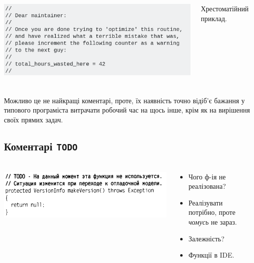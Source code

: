 \documentclass[12pt,pdf,utf8,ukrainian,aspectratio=169]{beamer}
\makeatletter
\newcommand*{\currentname}{\@currentlabelname}
\makeatother
\begin{document}
	\begin{frame}\frametitle{\currentname}
		\begin{columns}
			\begin{column}{10cm}
				\includegraphics[scale=0.65]{Comment_02.png}
			\end{column}
			\begin{column}{5cm} 
				\small
				Хрестоматійний приклад.
			\end{column}
		\end{columns}	
	\end{frame}
	
	\begin{frame}\frametitle{\currentname}
		\Large
		Можливо це не найкращі коментарі, проте, їх наявність точно відіб'є бажання		
		у типового програміста витрачати робочий час на щось інше, крім як на вирішення
		своїх прямих задач.
	\end{frame}

	\subsection{Коментарі \texttt{TODO}}
	\begin{frame}\frametitle{\currentname}
		\begin{columns}
			\begin{column}{7cm}
				\includegraphics[scale=0.5]{clean_code_8.png}
			\end{column}
			\begin{column}{5cm} 
				\small
				\begin{itemize}
					\item Чого ф-ія не реалізована? 
					\item Реалізувати потрібно, проте \textit{чомусь} не зараз.
					\item Залежність?
					\item Функції в IDE.
				\end{itemize}
			\end{column}
		\end{columns}		
	\end{frame}
\end{document}

